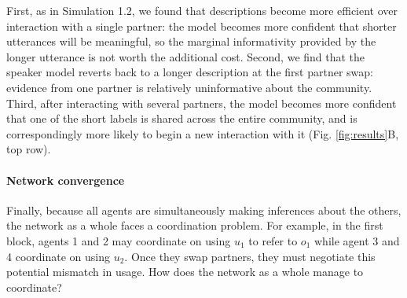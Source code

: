 
First, as in Simulation 1.2, we found that descriptions become more efficient over interaction with a single partner: the model becomes more confident that shorter utterances will be meaningful, so the marginal informativity provided by the longer utterance is not worth the additional cost.
Second, we find that the speaker model reverts back to a longer description at the first partner swap: evidence from one partner is relatively uninformative about the community.
Third, after interacting with several partners, the model becomes more confident that one of the short labels is shared across the entire community, and is correspondingly more likely to begin a new interaction with it (Fig. \ref{fig:results}B, top row).

\paragraph{Network convergence}

Finally, because all agents are simultaneously making inferences about the others, the network as a whole faces a coordination problem.
For example, in the first block, agents 1 and 2 may coordinate on using $u_1$ to refer to $o_1$ while agent 3 and 4 coordinate on using $u_2$. 
Once they swap partners, they must negotiate this potential mismatch in usage. 
How does the network as a whole manage to coordinate?

